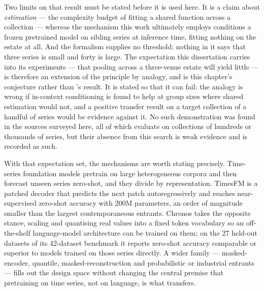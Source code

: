 Two limits on that result must be stated before it is used here. It is a claim
about \emph{estimation} --- the complexity budget of fitting a shared function
across a collection --- whereas the mechanism this work ultimately employs
conditions a frozen pretrained model on sibling series at inference time,
fitting nothing on the estate at all. And the formalism supplies no threshold:
nothing in it says that three series is small and forty is large. The
expectation this dissertation carries into its experiments --- that pooling
across a three-venue estate will yield little --- is therefore an extension of
the principle by analogy, and is this chapter's conjecture rather than
\citeauthor{montero-manso_principles_2021}'s result. It is stated so that it
can fail: the analogy is wrong if in-context conditioning is found to help at
group sizes where shared estimation would not, and a positive transfer result
on a target collection of a handful of series would be evidence against it. No
such demonstration was found in the sources surveyed here, all of which
evaluate on collections of hundreds or thousands of series, but their absence
from this search is weak evidence and is recorded as such.

With that expectation set, the mechanisms are worth stating precisely.
Time-series foundation models pretrain on large heterogeneous corpora and then
forecast unseen series zero-shot, and they divide by representation. TimesFM
\citep{das_decoder-only_2024} is a patched decoder that predicts the next patch
autoregressively and reaches near-supervised zero-shot accuracy with 200M
parameters, an order of magnitude smaller than the largest contemporaneous
entrants. Chronos \citep{ansari_chronos_2024} takes the opposite stance,
scaling and quantising real values into a fixed token vocabulary so an
off-the-shelf language-model architecture can be trained on them; on the 27
held-out datasets of its 42-dataset benchmark it reports zero-shot accuracy
comparable or superior to models trained on those series directly. A wider
family --- masked-encoder, quantile, masked-reconstruction and probabilistic or
industrial entrants
\citep{woo_unified_2024,liu_moirai_2026,goswami_moment_2024,rasul_lag-llama_2024,garza_timegpt-1_2024}
--- fills out the design space without changing the central premise that
pretraining on time series, not on language, is what transfers.

